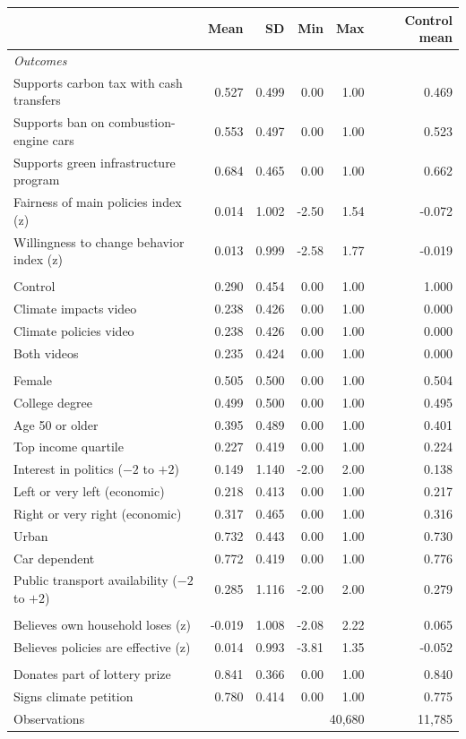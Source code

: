 \begin{tabular}{lrrrrr}
\toprule
 & Mean & SD & Min & Max & Control mean \\
\midrule
\multicolumn{6}{l}{\textit{Outcomes}}\\
Supports carbon tax with cash transfers & 0.527 & 0.499 & 0.00 & 1.00 & 0.469 \\
Supports ban on combustion-engine cars & 0.553 & 0.497 & 0.00 & 1.00 & 0.523 \\
Supports green infrastructure program & 0.684 & 0.465 & 0.00 & 1.00 & 0.662 \\
Fairness of main policies index (z) & 0.014 & 1.002 & -2.50 & 1.54 & -0.072 \\
Willingness to change behavior index (z) & 0.013 & 0.999 & -2.58 & 1.77 & -0.019 \\
\addlinespace
\multicolumn{6}{l}{\textit{Treatment arms}}\\
Control & 0.290 & 0.454 & 0.00 & 1.00 & 1.000 \\
Climate impacts video & 0.238 & 0.426 & 0.00 & 1.00 & 0.000 \\
Climate policies video & 0.238 & 0.426 & 0.00 & 1.00 & 0.000 \\
Both videos & 0.235 & 0.424 & 0.00 & 1.00 & 0.000 \\
\addlinespace
\multicolumn{6}{l}{\textit{Pre-treatment characteristics}}\\
Female & 0.505 & 0.500 & 0.00 & 1.00 & 0.504 \\
College degree & 0.499 & 0.500 & 0.00 & 1.00 & 0.495 \\
Age 50 or older & 0.395 & 0.489 & 0.00 & 1.00 & 0.401 \\
Top income quartile & 0.227 & 0.419 & 0.00 & 1.00 & 0.224 \\
Interest in politics ($-2$ to $+2$) & 0.149 & 1.140 & -2.00 & 2.00 & 0.138 \\
Left or very left (economic) & 0.218 & 0.413 & 0.00 & 1.00 & 0.217 \\
Right or very right (economic) & 0.317 & 0.465 & 0.00 & 1.00 & 0.316 \\
Urban & 0.732 & 0.443 & 0.00 & 1.00 & 0.730 \\
Car dependent & 0.772 & 0.419 & 0.00 & 1.00 & 0.776 \\
Public transport availability ($-2$ to $+2$) & 0.285 & 1.116 & -2.00 & 2.00 & 0.279 \\
\addlinespace
\multicolumn{6}{l}{\textit{Post-treatment beliefs (mediators)}}\\
Believes own household loses (z) & -0.019 & 1.008 & -2.08 & 2.22 & 0.065 \\
Believes policies are effective (z) & 0.014 & 0.993 & -3.81 & 1.35 & -0.052 \\
\addlinespace
\multicolumn{6}{l}{\textit{Real-stakes behavior}}\\
Donates part of lottery prize & 0.841 & 0.366 & 0.00 & 1.00 & 0.840 \\
Signs climate petition & 0.780 & 0.414 & 0.00 & 1.00 & 0.775 \\
\addlinespace
Observations & \multicolumn{4}{r}{40,680} & 11,785 \\
\bottomrule
\end{tabular}
